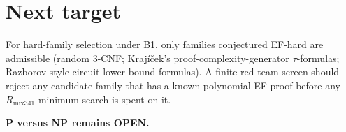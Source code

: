 \documentclass[11pt]{article}
\begin{document}
\section{Next target}
For hard-family selection under B1, only families conjectured EF-hard are
admissible (random 3-CNF; Krajíček's proof-complexity-generator $\tau$-formulas;
Razborov-style circuit-lower-bound formulas). A finite red-team screen should
reject any candidate family that has a known polynomial EF proof before any
$R_{\mathrm{mix341}}$ minimum search is spent on it.

\medskip
\noindent\textbf{P versus NP remains OPEN.}

\end{document}

